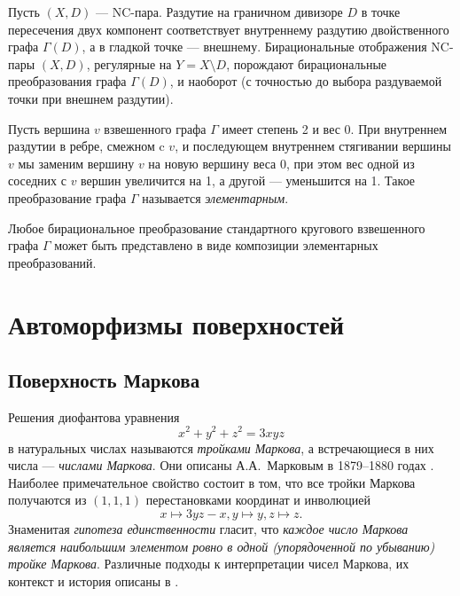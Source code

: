 \begin{remark}
Пусть $(X,D)$ --- NC-пара. Раздутие на граничном дивизоре $D$ в точке пересечения двух компонент соответствует внутреннему раздутию двойственного графа $\Gamma(D)$, а в гладкой точке --- внешнему.
Бирациональные отображения NC-пары $(X,D)$, регулярные на $Y=X\setminus D$, порождают бирациональные преобразования графа $\Gamma(D)$, и наоборот (с точностью до выбора раздуваемой точки при внешнем раздутии). 
\end{remark}

\begin{definition}
Пусть вершина $v$ взвешенного графа $\Gamma$ имеет степень 2 и вес 0. При внутреннем раздутии в ребре, смежном c $v$, и последующем внутреннем стягивании вершины $v$ мы заменим вершину $v$ на новую вершину веса 0, при этом вес одной из соседних с $v$ вершин увеличится на 1, а другой --- уменьшится на 1.
Такое преобразование графа $\Gamma$ называется \emph{элементарным}.
\end{definition}

\begin{theorem}\label{th:circular}
Любое бирациональное преобразование стандартного кругового взвешенного графа $\Gamma$ может быть представлено в виде композиции элементарных преобразований.
\end{theorem}

\section{Автоморфизмы поверхностей}
\subsection{Поверхность Маркова}

 Решения диофантова уравнения 
 \begin{equation}\label{eq:Markov}
 x^2+y^2+z^2=3xyz    
 \end{equation}
 в натуральных числах называются \emph{тройками Маркова}, а встречающиеся в них числа --- \emph{числами Маркова}. Они описаны А.А.~Марковым в 1879--1880 годах \cite{M1, Ma80}. Наиболее примечательное свойство состоит в том, что все тройки Маркова получаются из $(1,1,1)$ перестановками координат и инволюцией \[x\mapsto 3yz-x,y\mapsto y, z\mapsto z.\] Знаменитая \emph{гипотеза единственности} гласит, что \emph{каждое число Маркова является наибольшим элементом ровно в одной (упорядоченной по убыванию) тройке Маркова}.
 Различные подходы к интерпретации чисел Маркова, их контекст и история описаны в \cite{Ai13}.
 
